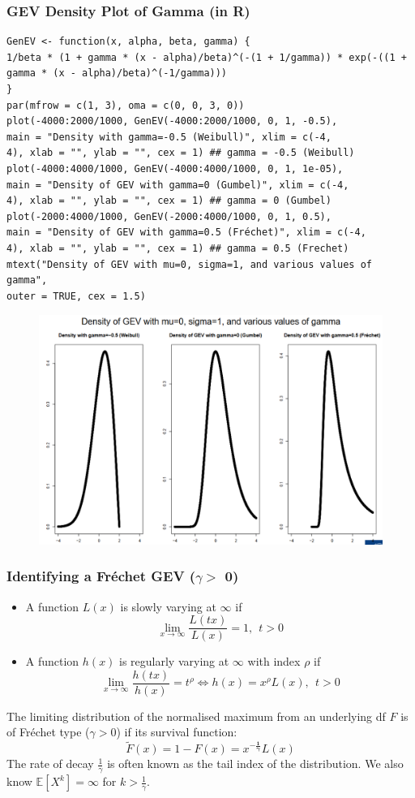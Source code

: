 \documentclass[11pt]{article}
\newcommand{\noi}{\noindent}
\begin{document}
\subsubsection{GEV Density Plot of Gamma (in R)}
\begin{lstlisting}
GenEV <- function(x, alpha, beta, gamma) {
1/beta * (1 + gamma * (x - alpha)/beta)^(-(1 + 1/gamma)) * exp(-((1 +
gamma * (x - alpha)/beta)^(-1/gamma)))
}
par(mfrow = c(1, 3), oma = c(0, 0, 3, 0))
plot(-4000:2000/1000, GenEV(-4000:2000/1000, 0, 1, -0.5),
main = "Density with gamma=-0.5 (Weibull)", xlim = c(-4,
4), xlab = "", ylab = "", cex = 1) ## gamma = -0.5 (Weibull)
plot(-4000:4000/1000, GenEV(-4000:4000/1000, 0, 1, 1e-05),
main = "Density of GEV with gamma=0 (Gumbel)", xlim = c(-4,
4), xlab = "", ylab = "", cex = 1) ## gamma = 0 (Gumbel)
plot(-2000:4000/1000, GenEV(-2000:4000/1000, 0, 1, 0.5),
main = "Density of GEV with gamma=0.5 (Fréchet)", xlim = c(-4,
4), xlab = "", ylab = "", cex = 1) ## gamma = 0.5 (Frechet)
mtext("Density of GEV with mu=0, sigma=1, and various values of gamma",
outer = TRUE, cex = 1.5)
\end{lstlisting}
\begin{figure}[H]
    \centering
    \includegraphics[width=0.6\linewidth]{Density of GEV Gamma.png}
\end{figure}

\subsubsection{Identifying a Fr\'echet GEV ($\gamma >$ 0)}
\begin{itemize}
    \item A function $L(x)$ is slowly varying at $\infty$ if
        $$\lim_{x\rightarrow\infty}\frac{L(tx)}{L(x)} = 1, \: \ t>0$$
    \item A function $h(x)$ is regularly varying at $\infty$ with index $\rho$ if
        $$\lim_{x\rightarrow\infty}\frac{h(tx)}{h(x)} = t^\rho \Leftrightarrow h(x) = x^\rho L(x), \: \ t > 0$$
\end{itemize}
\noi The limiting distribution of the normalised maximum from an underlying df $F$ is of Fr\'echet type ($\gamma > 0$) if its survival function:
$$\tilde{F}(x) = 1 - F(x) = x^{\boldsymbol{-\frac{1}{\gamma}}}L(x)$$
\noi The rate of decay $\frac{1}{\gamma}$ is often known as the tail index of the distribution. We also know $\mathbb{E}[X^k] = \infty$ for $k > \frac{1}{\gamma}$. \\
\end{document}
